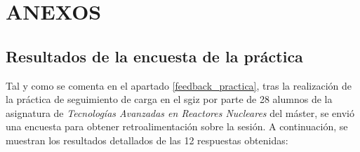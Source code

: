 
\newpage
\section*{ANEXOS} \label{sec:anexos} %

\renewcommand{\thesubsection}{\Alph{subsection}} %
\renewcommand{\thetable}{\Alph{subsection}.\arabic{table}}
\renewcommand{\thefigure}{\Alph{subsection}.\arabic{figure}}
\renewcommand{\thecode}{\Alph{subsection}.\arabic{code}}

\setcounter{subsection}{0}
\setcounter{table}{0}
\setcounter{figure}{0}

\subsection{Resultados de la encuesta de la práctica} \label{resultados_encuesta_practica}

Tal y como se comenta en el apartado \ref{feedback_practica}, tras la realización de la práctica de seguimiento de carga en el \acrshort{sgiz} por parte de 28 alumnos de la asignatura de \textit{Tecnologías Avanzadas en Reactores Nucleares} del máster, se envió una encuesta para obtener retroalimentación sobre la sesión. A continuación, se muestran los resultados detallados de las 12 respuestas obtenidas:

